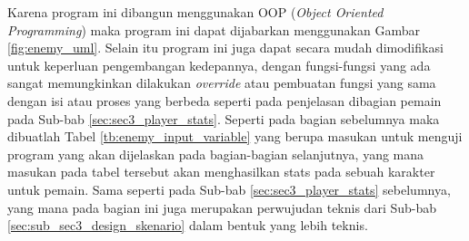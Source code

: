 Karena program ini dibangun menggunakan OOP (\textit{Object Oriented Programming}) maka program ini dapat dijabarkan menggunakan Gambar \ref{fig:enemy_uml}. Selain itu program ini juga dapat secara mudah dimodifikasi untuk keperluan pengembangan kedepannya, dengan fungsi-fungsi yang ada sangat memungkinkan dilakukan \textit{override} atau pembuatan fungsi yang sama dengan isi atau proses yang berbeda seperti pada penjelasan dibagian pemain pada Sub-bab \ref{sec:sec3_player_stats}. Seperti pada bagian sebelumnya maka dibuatlah Tabel \ref{tb:enemy_input_variable} yang berupa masukan untuk menguji program yang akan dijelaskan pada bagian-bagian selanjutnya, yang mana masukan pada tabel tersebut akan menghasilkan stats pada sebuah karakter untuk pemain. Sama seperti pada Sub-bab \ref{sec:sec3_player_stats} sebelumnya, yang mana pada bagian ini juga merupakan perwujudan teknis dari Sub-bab \ref{sec:sub_sec3_design_skenario} dalam bentuk yang lebih teknis.

